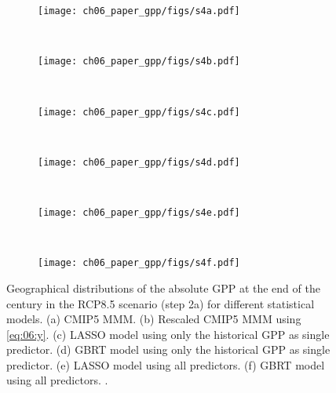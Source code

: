 \begin{figure}[p]
  \centering
  \begin{subfigure}[b]{\SubfigureWidth{}}
    \texttt{[image: ch06\_paper\_gpp/figs/s4a.pdf]}
    \caption{}
    \label{fig:app:b:step2a_results:a}
  \end{subfigure}
  ~
  \begin{subfigure}[b]{\SubfigureWidth{}}
    \texttt{[image: ch06\_paper\_gpp/figs/s4b.pdf]}
    \caption{}
    \label{fig:app:b:step2a_results:b}
  \end{subfigure}
  \\
    \begin{subfigure}[b]{\SubfigureWidth{}}
    \texttt{[image: ch06\_paper\_gpp/figs/s4c.pdf]}
    \caption{}
    \label{fig:app:b:step2a_results:c}
  \end{subfigure}
  ~
  \begin{subfigure}[b]{\SubfigureWidth{}}
    \texttt{[image: ch06\_paper\_gpp/figs/s4d.pdf]}
    \caption{}
    \label{fig:app:b:step2a_results:d}
  \end{subfigure}
  \\
    \begin{subfigure}[b]{\SubfigureWidth{}}
    \texttt{[image: ch06\_paper\_gpp/figs/s4e.pdf]}
    \caption{}
    \label{fig:app:b:step2a_results:e}
  \end{subfigure}
  ~
  \begin{subfigure}[b]{\SubfigureWidth{}}
    \texttt{[image: ch06\_paper\_gpp/figs/s4f.pdf]}
    \caption{}
    \label{fig:app:b:step2a_results:f}
  \end{subfigure}
  \caption[
    Geographical distributions of the absolute \acf{GPP} at the end of the
     century in the \acs{RCP}8.5 scenario (step 2a) for different
    statistical models.
  ]{
    Geographical distributions of the absolute \acf{GPP} at the end of the
     century in the \acs{RCP}8.5 scenario (step 2a) for different
    statistical models. (a) \acs{CMIP}5 \acf{MMM}. (b) Rescaled \acs{CMIP}5
    \acs{MMM} using \cref{eq:06:y}. (c) \Acf{LASSO} model using only the
    historical \acs{GPP} as single predictor. (d) \Acf{GBRT} model using only
    the historical \acs{GPP} as single predictor. (e) \acs{LASSO} model using
    all predictors. (f) \acs{GBRT} model using all predictors.
    .
  }
  \label{fig:app:b:step2a_results}
\end{figure}

